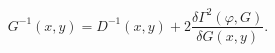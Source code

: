 \begin{equation}
G^{-1}(x,y)=D^{-1}(x,y)+2\frac{\delta\Gamma^{2}(\varphi,G)}{\delta
G(x,y)}.
\label{gap2}%
\end{equation}

